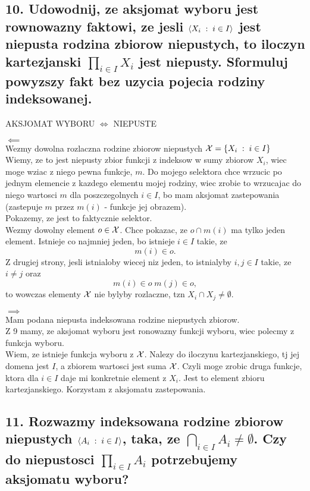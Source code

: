 \documentclass{article}
\begin{document}
\subsection*{10. Udowodnij, ze aksjomat wyboru jest rownowazny faktowi, ze jesli $\langle X_i\;:\;i\in I\rangle$ jest niepusta rodzina zbiorow niepustych, to iloczyn kartezjanski $\prod\limits_{i\in I}X_i$ jest niepusty. Sformuluj powyzszy fakt bez uzycia pojecia rodziny indeksowanej.}

AKSJOMAT WYBORU $\iff$ NIEPUSTE

$\impliedby$\smallskip\\
Wezmy dowolna rozlaczna rodzine zbiorow niepustych $\mathcal{X}=\{X_i\;:\;i\in I\}$\smallskip\\
Wiemy, ze to jest niepusty zbior funkcji z indeksow w sumy zbiorow $X_i$, wiec moge wziac z niego pewna funkcje, $m$. Do mojego selektora chce wrzucic po jednym elemencie z kazdego elementu mojej rodziny, wiec zrobie to wrzucajac do niego wartosci $m$ dla poszczegolnych $i\in I$, bo mam aksjomat zastepowania (zastepuje $m$ przez $m(i)$ - funkcje jej obrazem).\smallskip\\
Pokazemy, ze jest to faktycznie selektor.\\
Wezmy dowolny element $o\in\mathcal{X}$. Chce pokazac, ze $o\cap m(i)$ ma tylko jeden element. Istnieje co najmniej jeden, bo istnieje $i\in I$ takie, ze
$$m(i)\in o.$$
Z drugiej strony, jesli istnialoby wiecej niz jeden, to istnialyby $i, j\in I$ takie, ze $i\neq j$ oraz
$$m(i)\in o\;m(j)\in o,$$
to wowczas elementy $\mathcal{X}$ nie bylyby rozlaczne, tzn $X_i\cap X_j\neq \emptyset$.\medskip

$\implies$\smallskip\\
Mam podana niepusta indeksowana rodzine niepustych zbiorow.\smallskip\\
Z 9 mamy, ze aksjomat wyboru jest ronowazny funkcji wyboru, wiec polecmy z funkcja wyboru.\smallskip\\
Wiem, ze istnieje funkcja wyboru z $\mathcal{X}$. Nalezy do iloczynu kartezjanskiego, tj jej domena jest $I$, a zbiorem wartosci jest suma $\mathcal{X}$. Czyli moge zrobic druga funkcje, ktora dla $i\in I$ daje mi konkretnie element z $X_i$. Jest to element zbioru kartezjanskiego. Korzystam z aksjomatu zastepowania.

\subsection*{11. Rozwazmy indeksowana rodzine zbiorow niepustych $\langle A_i\;:\;i\in I\rangle$, taka, ze $\bigcap\limits_{i\in I}A_i\neq\emptyset$. Czy do niepustosci $\prod\limits_{i\in I}A_i$ potrzebujemy aksjomatu wyboru?}
\end{document}
